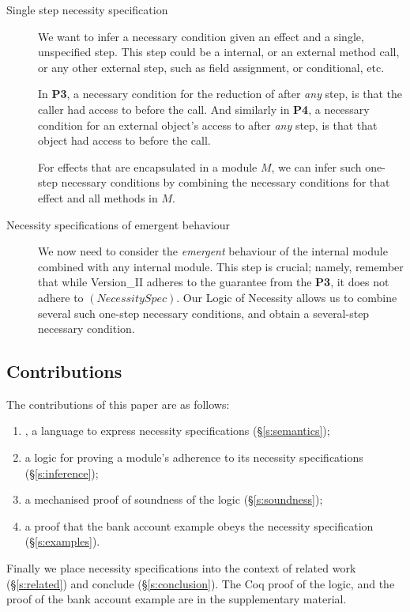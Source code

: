 \begin{description}
  
\item[Single step necessity specification]
We want to infer
a necessary condition given an effect and
a single, unspecified step. This step could be a internal, or an external method call,
or any other external step, such as field assignment, or conditional, etc.

In \textbf{P3},   a necessary condition for the  reduction of   after \emph{any}
step, is that the caller  had access to  before the call.
And similarly in \textbf{P4},   a necessary condition for an external object's
access to   after \emph{any}
step, is that that object had access to  before the call.

For effects that are encapsulated in a module $M$, we can infer such one-step
necessary conditions by combining the necessary conditions for that effect and 
all   methods in $M$.



\item[Necessity specifications of emergent behaviour]
  
We now need to consider the \emph{emergent} behaviour of the internal module
combined with any internal module. This step is crucial; namely, remember that while Version\_II adheres to
the guarantee from the \textbf{P3}, it does not adhere to  $(NecessitySpec)$.   
Our Logic of Necessity allows us to combine  several such one-step necessary conditions, and obtain a several-step necessary condition.
 
\end{description} 


\subsection{Contributions}

The contributions of this paper are as follows:
 
 \begin{enumerate}
 \item
\Chainmail, a language to
express necessity specifications (\S\ref{s:semantics});
 \item
a logic for proving a module's adherence to its
necessity specifications (\S\ref{s:inference});
\item
  a mechanised proof of soundness of the logic (\S\ref{s:soundness});
\item
  a proof that the bank account example obeys the necessity
  specification (\S\ref{s:examples}).
\end{enumerate}


\noindent Finally we place necessity specifications into the context
of related work (\S\ref{s:related}) and conclude (\S\ref{s:conclusion}).
The Coq proof of the logic, and the proof of the bank account example are in the
supplementary material.
